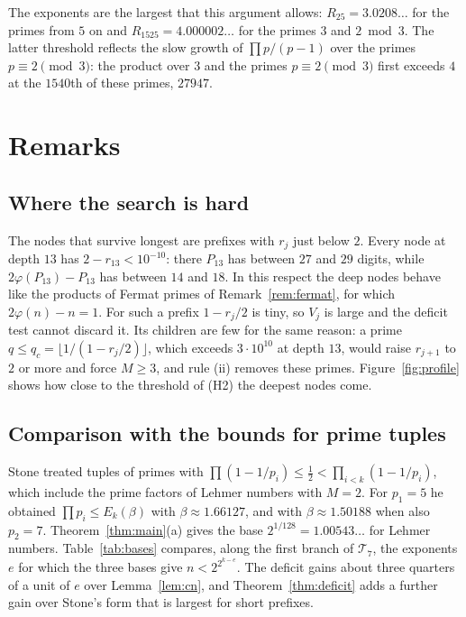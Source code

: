\documentclass[11pt,reqno]{amsart}
\numberwithin{equation}{section}
\theoremstyle{plain}
\theoremstyle{definition}
\theoremstyle{remark}
\begin{document}
The exponents are the largest that this argument allows:
$R_{25}=3.0208\ldots$ for the primes from $5$ on and
$R_{1525}=4.000002\ldots$ for the primes $3$ and $2\bmod3$. The
latter threshold reflects the slow growth of $\prod p/(p-1)$ over the
primes $p\equiv2\pmod3$: the product over $3$ and the primes
$p\equiv2\pmod3$ first exceeds $4$ at the $1540$th of these primes,
$27947$.

\section{Remarks}\label{sec:remarks}

\subsection{Where the search is hard}
The nodes that survive longest are prefixes with $r_j$ just below $2$.
Every node at depth $13$ has $2-r_{13}<10^{-10}$: there $P_{13}$ has
between $27$ and $29$ digits, while $2\varphi(P_{13})-P_{13}$ has
between $14$ and $18$.
In this respect the deep nodes behave like the products of Fermat
primes of Remark~\ref{rem:fermat}, for which
$2\varphi(n)-n=1$. For such a prefix $1-r_j/2$ is tiny, so $V_j$ is
large and the deficit test cannot discard it. Its children are few
for the same reason: a prime $q\le q_c=\lfloor1/(1-r_j/2)\rfloor$,
which exceeds $3\cdot10^{10}$ at depth $13$, would raise $r_{j+1}$
to $2$ or more and force $M\ge3$, and rule (ii) removes these primes.
Figure~\ref{fig:profile} shows how close to the threshold of (H2) the
deepest nodes come.

\subsection{Comparison with the bounds for prime tuples}
Stone \cite[(52), (53)]{Sto24} treated tuples of primes with
$\prod(1-1/p_i)\le\frac12<\prod_{i<k}(1-1/p_i)$, which include the
prime factors of Lehmer numbers with $M=2$. For $p_1=5$ he obtained
$\prod p_i\le E_k(\beta)$ with $\beta\approx1.66127$, and with
$\beta\approx1.50188$ when also $p_2=7$. Theorem~\ref{thm:main}(a)
gives the base $2^{1/128}=1.00543\ldots$ for Lehmer numbers.
Table~\ref{tab:bases} compares, along the first branch of
$\mathcal T_7$, the exponents $e$ for which the three bases give
$n<2^{2^{k-e}}$. The deficit gains about three quarters of a unit of
$e$ over Lemma~\ref{lem:cn}, and Theorem~\ref{thm:deficit} adds a
further gain over Stone's form that is largest for short prefixes.
\end{document}
